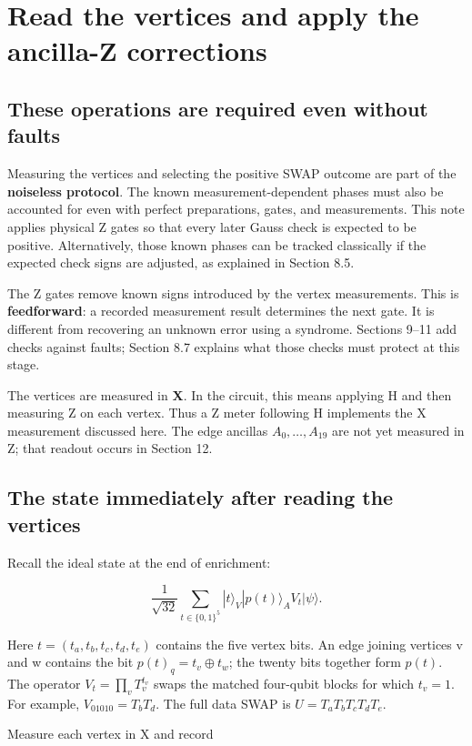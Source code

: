 \documentclass[11pt]{article}
\begin{document}
\section{Read the vertices and apply the ancilla-Z corrections}
\subsection{These operations are required even without faults}
Measuring the vertices and selecting the positive SWAP outcome are part of the \textbf{noiseless protocol}. The known measurement-dependent phases must also be accounted for even with perfect preparations, gates, and measurements. This note applies physical Z gates so that every later Gauss check is expected to be positive. Alternatively, those known phases can be tracked classically if the expected check signs are adjusted, as explained in Section 8.5.

The Z gates remove known signs introduced by the vertex measurements. This is \textbf{feedforward}: a recorded measurement result determines the next gate. It is different from recovering an unknown error using a syndrome. Sections 9--11 add checks against faults; Section 8.7 explains what those checks must protect at this stage.

The vertices are measured in \textbf{X}. In the circuit, this means applying H and then measuring Z on each vertex. Thus a Z meter following H implements the X measurement discussed here. The edge ancillas \(A_0,\ldots,A_{19}\) are not yet measured in Z; that readout occurs in Section 12.

\subsection{The state immediately after reading the vertices}
Recall the ideal state at the end of enrichment:

\[
\frac1{\sqrt{32}}\sum_{t\in\{0,1\}^5}
|t\rangle_V|p(t)\rangle_A V_t|\psi\rangle.
\]

Here \(t=(t_a,t_b,t_c,t_d,t_e)\) contains the five vertex bits. An edge joining vertices v and w contains the bit \(p(t)_q=t_v\oplus t_w\); the twenty bits together form \(p(t)\). The operator \(V_t=\prod_vT_v^{t_v}\) swaps the matched four-qubit blocks for which \(t_v=1\). For example, \(V_{01010}=T_bT_d\). The full data SWAP is \(U=T_aT_bT_cT_dT_e\).

Measure each vertex in X and record
\end{document}
